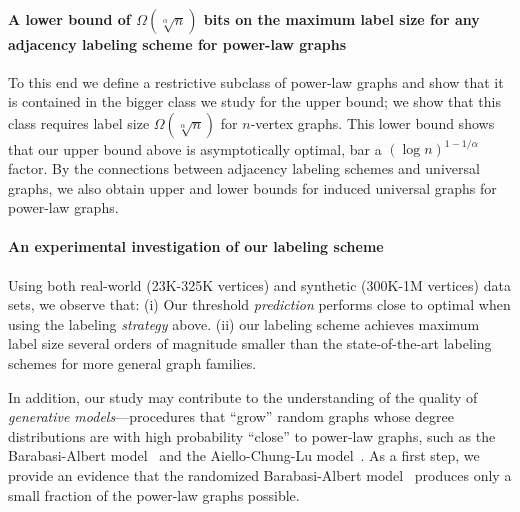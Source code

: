\paragraph{A lower bound of $\Omega(\sqrt[\alpha]{n})$ bits on the maximum label size for any adjacency labeling scheme for power-law graphs}
To this end we define a  restrictive subclass of power-law graphs and show that it is contained in the bigger class we study for the upper bound; we show that this class requires label size $\Omega(\sqrt[\alpha]{n})$ for $n$-vertex graphs.
This lower bound shows that our upper bound above is asymptotically  optimal, bar a $(\log n)^{1 - 1/\alpha}$ factor.
By the connections between adjacency labeling schemes and universal graphs, we also obtain upper and lower bounds for induced universal graphs for power-law graphs. 


\paragraph{An experimental investigation  of our labeling scheme}
Using both real-world (23K-325K vertices) and synthetic (300K-1M vertices) data sets, we observe that:
(i) Our threshold \emph{prediction} performs close to optimal when using the labeling \emph{strategy} above. 
(ii) our labeling scheme achieves maximum label size several orders of magnitude smaller than the state-of-the-art labeling schemes for more general graph families.
\vspace{\baselineskip}

In addition, our study  may contribute to  the understanding of the quality of  \emph{generative models}---procedures that ``grow'' random graphs whose degree distributions are with high probability ``close'' to power-law graphs,  such as the Barabasi-Albert model~\cite{barabasi1999emergence} and the   Aiello-Chung-Lu model~\cite{aiello2001random}. As a first step, we provide an evidence  that the randomized Barabasi-Albert model~\cite{barabasi1999emergence} produces only a small fraction of the power-law graphs possible.








